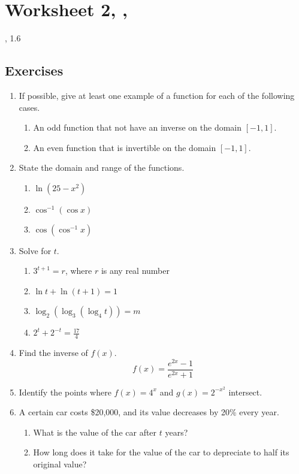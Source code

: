 \newpage\section*{Worksheet 2, \Course, \Semester} 
\noindent {}, 1.6
\subsection*{Exercises}


\begin{enumerate}
	\item If possible, give at least one example of a function for each of the following cases.
    \begin{enumerate}
    	\item An odd function that not have an inverse on the domain $[-1,1]$.
        \item An even function that is invertible on the domain $[-1,1]$.
    \end{enumerate}
    \item State the domain and range of the functions.  
    \begin{enumerate}
    	\item $\ln (25 - x^2)$
        \item $\cos^{-1} (\cos x)$
        \item $\cos (\cos^{-1} x)$
    \end{enumerate}
	\item Solve for $t$. 
    	\begin{enumerate}
        	\item $3^{t+1} = r$, where $r$ is any real number
            \item $\ln t + \ln (t+1) = 1$
            \item $\log_2 (\log_3 ( \log_4 t)) = m$
            \item $2^t+2^{-t} = \frac{17}{4}$
		\end{enumerate}
     \item Find the inverse of $f(x)$. $$f(x) = \frac{e^{2x} -1}{e^{2x} + 1}$$
     \item Identify the points where $f(x) = 4^x$ and $g(x) = 2^{-x^2}$ intersect. 
     \item A certain car costs \$20,000, and its value decreases by 20\% every year. 
     \begin{enumerate} 
     	\item What is the value of the car after $t$ years?  
        \item How long does it take for the value of the car to depreciate to half its original value?
     \end{enumerate}

\end{enumerate}